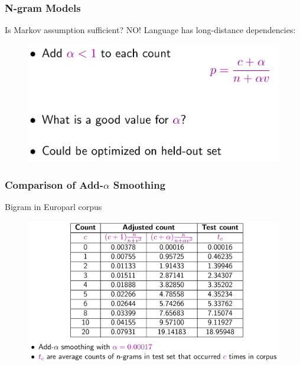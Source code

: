 \documentclass{beamer}
\begin{document}
\begin{frame}\frametitle{N-gram Models}

\begin{block}{Is Markov assumption sufficient? \alert{NO!}}
Language has long-distance dependencies:

\begin{figure}
\includegraphics[width=0.6\linewidth]{figure/add_alpha_smoothing.pdf}
\label{fig:add_alpha_smoothing}
\end{figure}
\end{block}

\end{frame}


\begin{frame}\frametitle{Comparison of Add-$\alpha$ Smoothing}

\begin{block}{Bigram in Europarl corpus}

\begin{figure}
\includegraphics[width=0.9\linewidth]{figure/bigram_alpha_smoothing.pdf}
\label{fig:bigram_alpha_smoothing}
\end{figure}

\end{block}
\end{frame}
\end{document}
